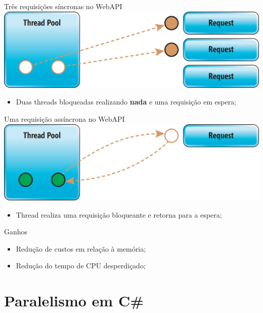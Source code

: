 \documentclass[10pt]{beamer}
\begin{document}
\begin{frame}{Três requisições síncronas no WebAPI}
	\includegraphics[width=\textwidth]{imgs/sync2}
	\begin{itemize}
		\item Duas threads bloqueadas realizando \textbf{nada} e uma requisição em espera;
	\end{itemize}
\end{frame}

\begin{frame}{Uma requisição assíncrona no WebAPI}
	\includegraphics[width=\textwidth]{imgs/async}
	\begin{itemize}
		\item Thread realiza uma requisição bloqueante e retorna para a espera;
	\end{itemize}
\end{frame}

\begin{frame}{Ganhos}
	\begin{itemize}
		\item Redução de custos em relação à memória;
		\vspace{0.2cm}
		\item Redução do tempo de CPU desperdiçado;
	\end{itemize}
\end{frame}

\section{Paralelismo em C\#}
\end{document}

